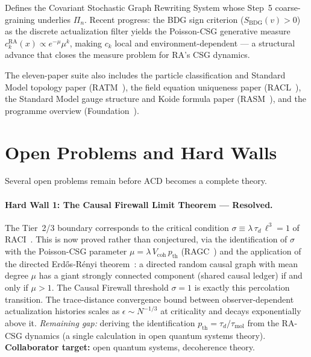 \documentclass[11pt,a4paper]{article}
\theoremstyle{remark}
\begin{document}
\begin{description}[leftmargin=1.5em]
  \item[\textbf{EB}~\citep{Sandeman2026RAEB}] Defines the Covariant Stochastic
    Graph Rewriting System whose Step~5 coarse-graining underlies $\Pi_n$.
    Recent progress: the BDG sign criterion ($S_{\mathrm{BDG}}(v) > 0$) as the
    discrete actualization filter yields the Poisson-CSG generative measure
    $c_k^{\mathrm{RA}}(x) \propto e^{-\mu}\mu^k$, making $c_k$ local and
    environment-dependent --- a structural advance that closes the measure
    problem for RA's CSG dynamics.
\end{description}

\noindent
The eleven-paper suite also includes the particle classification and Standard
Model topology paper (RATM~\citep{Sandeman2026RATM}), the field equation
uniqueness paper (RACL~\citep{Sandeman2026RACL}), the Standard Model gauge
structure and Koide formula paper (RASM~\citep{Sandeman2026RASM}), and the
programme overview (Foundation~\citep{Sandeman2026Foundation}).

\section{Open Problems and Hard Walls}
\label{sec:hardwalls}

Several open problems remain before ACD becomes a complete theory.

\paragraph{Hard Wall 1: The Causal Firewall Limit Theorem --- Resolved.}
The Tier~2/3 boundary corresponds to the critical condition
$\sigma \equiv \lambda\,\tau_d\,\ell^3 = 1$ of RACI~\citep{Sandeman2026c}.
This is now proved rather than conjectured, via the identification of $\sigma$
with the Poisson-CSG parameter $\mu = \lambda\,V_{\mathrm{coh}}\,p_{\mathrm{th}}$
(RAGC~\citep{Sandeman2026b}) and the application of the directed
Erd\H{o}s-R\'{e}nyi theorem~\citep{ErdosRenyi1960}: a directed random causal
graph with mean degree $\mu$ has a giant strongly connected component (shared
causal ledger) if and only if $\mu > 1$. The Causal Firewall threshold $\sigma=1$
is exactly this percolation transition. The trace-distance convergence bound
between observer-dependent actualization histories scales as $\epsilon \sim
N^{-1/3}$ at criticality and decays exponentially above it.
\emph{Remaining gap:} deriving the identification $p_{\mathrm{th}} =
\tau_d/\tau_{\mathrm{mol}}$ from the RA-CSG dynamics (a single calculation
in open quantum systems theory).
\textbf{Collaborator target:} open quantum systems, decoherence theory.
\end{document}
